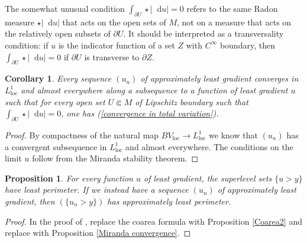 \documentclass[reqno,12pt,letterpaper]{amsart}
\newcommand*\dif{\mathop{}\!\mathrm{d}}
\newcommand{\loc}{\mathrm{loc}}
\newtheorem{proposition}[theorem]{Proposition}
\newtheorem{corollary}[theorem]{Corollary}
\theoremstyle{definition}
\numberwithin{equation}{section}
\begin{document}
The somewhat unusual condition $\int_{\partial U} \star |\dif u| = 0$ refers to the same Radon measure $\star |\dif u|$ that acts on the open sets of $M$, not on a measure that acts on the relatively open subsets of $\partial U$.
It should be interpreted as a transversality condition: if $u$ is the indicator function of a set $Z$ with $C^\infty$ boundary, then $\int_{\partial U} \star |\dif u| = 0$ if $\partial U$ is transverse to $\partial Z$.

\begin{corollary}\label{compactness}
Every sequence $(u_n)$ of approximately least gradient converges in $L^1_\loc$ and almost everywhere along a subsequence to a function of least gradient $u$ such that for every open set $U \Subset M$ of Lipschitz boundary such that $\int_{\partial U} \star |\dif u| = 0$, one has (\ref{convergence in total variation}).
\end{corollary}
\begin{proof}
By compactness of the natural map $BV_\loc \to L^1_\loc$ we know that $(u_n)$ has a convergent subsequence in $L^1_\loc$ and almost everywhere.
The conditions on the limit $u$ follow from the Miranda stability theorem.
\end{proof}

\begin{proposition}\label{level sets are minimal}
For every function $u$ of least gradient, the superlevel sets $\{u > y\}$ have least perimeter.
If we instead have a sequence $(u_n)$ of approximately least gradient, then $(\{u_n > y\})$ has approximately least perimeter.
\end{proposition}
\begin{proof}
In the proof of \cite[Theorem 1]{BOMBIERI1969}, replace the coarea formula \cite[Theorem 1.6]{Miranda66} with Proposition \ref{Coarea2} and replace \cite[Teorema 3]{Miranda67} with Proposition \ref{Miranda convergence}.
\end{proof}
\end{document}
